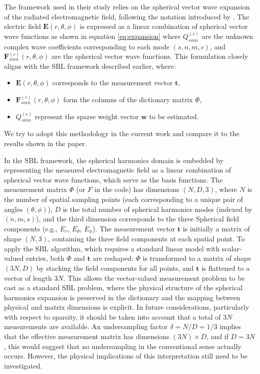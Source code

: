 \documentclass{article}
\begin{document}
The framework used in their study relies on the spherical vector wave expansion of the radiated electromagnetic field, following the notation introduced by \citet{hansen1988spherical}. The electric field $\mathbf{E}(r,\theta,\phi)$ is expressed as a linear combination of spherical vector wave functions as shown in equation \ref{eq:expansion} where $Q_{smn}^{(c)}$ are the unknown complex wave coefficients corresponding to each mode $(s,n,m,c)$, and $\mathbf{F}_{smn}^{(c)}(r,\theta,\phi)$ are the spherical vector wave functions. This formulation closely aligns with the SBL framework described earlier, where:
\begin{itemize}
\item $\mathbf{E}(r,\theta,\phi)$ corresponds to the measurement vector $\mathbf{t}$,
\item $\mathbf{F}_{smn}^{(c)}(r,\theta,\phi)$ form the columns of the dictionary matrix $\Phi$,
\item $Q_{smn}^{(c)}$ represent the sparse weight vector $\mathbf{w}$ to be estimated.
\end{itemize}
We try to adopt this methodology in the current work and compare it to the results shown in the paper.

In the SBL framework, the spherical harmonics domain is embedded by representing the measured electromagnetic field as a linear combination of spherical vector wave functions, which serve as the basis functions. The measurement matrix $\Phi$ (or $F$ in the code) has dimensions $(N, D, 3)$, where $N$ is the number of spatial sampling points (each corresponding to a unique pair of angles $(\theta, \phi)$), $D$ is the total number of spherical harmonics modes (indexed by $(n, m, s)$), and the third dimension corresponds to the three Spherical field components (e.g., $E_r$, $E_\theta$, $E_\phi$). The measurement vector $\mathbf{t}$ is initially a matrix of shape $(N, 3)$, containing the three field components at each spatial point. To apply the SBL algorithm, which requires a standard linear model with scalar-valued entries, both $\Phi$ and $\mathbf{t}$ are reshaped: $\Phi$ is transformed to a matrix of shape $(3N, D)$ by stacking the field components for all points, and $\mathbf{t}$ is flattened to a vector of length $3N$. This allows the vector-valued measurement problem to be cast as a standard SBL problem, where the physical structure of the spherical harmonics expansion is preserved in the dictionary and the mapping between physical and matrix dimensions is explicit.
In future considerations, particularly with respect to sparsity, it should be taken into account that a total of $3N$ measurements are available. An undersampling factor $\delta = N/D = 1/3$ implies that the effective measurement matrix has dimensions $(3N) \times D$, and if $D = 3N$, this would suggest that no undersampling in the conventional sense actually occurs. However, the physical implications of this interpretation still need to be investigated.
\end{document}
